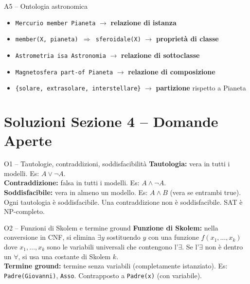 \documentclass[12pt,a4paper]{article}
\begin{document}
\begin{risposta}{A5 -- Ontologia astronomica}
\begin{itemize}[noitemsep]
  \item \texttt{Mercurio member Pianeta} $\to$ \textbf{relazione di istanza}
  \item \texttt{member(X, pianeta) $\Rightarrow$ sferoidale(X)} $\to$ \textbf{proprietà di classe}
  \item \texttt{Astrometria isa Astronomia} $\to$ \textbf{relazione di sottoclasse}
  \item \texttt{Magnetosfera part-of Pianeta} $\to$ \textbf{relazione di composizione}
  \item \texttt{\{solare, extrasolare, interstellare\}} $\to$ \textbf{partizione} rispetto a Pianeta
\end{itemize}
\end{risposta}

\section*{Soluzioni Sezione 4 -- Domande Aperte}

\begin{risposta}{O1 -- Tautologie{,} contraddizioni{,} soddisfacibilità}
\textbf{Tautologia:} vera in tutti i modelli. Es: $A \lor \neg A$. \\
\textbf{Contraddizione:} falsa in tutti i modelli. Es: $A \land \neg A$. \\
\textbf{Soddisfacibile:} vera in almeno un modello. Es: $A \land B$ (vera se entrambi true). \\
Ogni tautologia è soddisfacibile. Una contraddizione non è soddisfacibile. SAT è NP-completo.
\end{risposta}

\begin{risposta}{O2 -- Funzioni di Skolem e termine ground}
\textbf{Funzione di Skolem:} nella conversione in CNF, si elimina $\exists y$ sostituendo $y$ con una funzione $f(x_1,\ldots,x_k)$ dove $x_1,\ldots,x_k$ sono le variabili universali che contengono l'$\exists$. Se l'$\exists$ non è dentro un $\forall$, si usa una costante di Skolem $k$. \\
\textbf{Termine ground:} termine senza variabili (completamente istanziato). Es: \texttt{Padre(Giovanni)}, \texttt{Asso}. Contrapposto a \texttt{Padre(x)} (con variabile).
\end{risposta}
\end{document}
